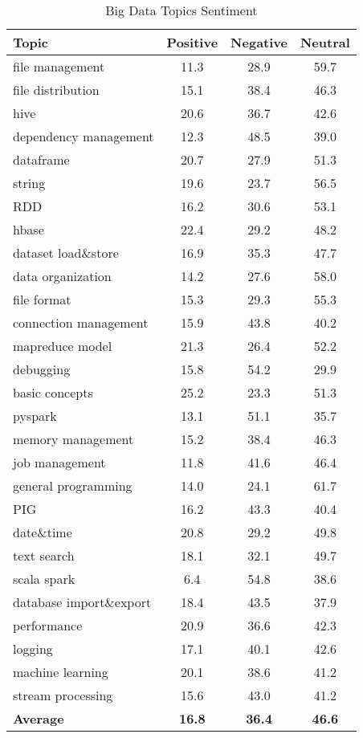 \begin{table}[tbp]
\caption{Big Data Topics Sentiment}
\label{tab:SentiBigdata}
\centering
\begin{tabular}{lccc} \hline
\textbf{Topic} & \textbf{Positive} & \textbf{Negative} & \textbf{Neutral} \\ \hline
file management & 11.3 & 28.9 & 59.7 \\
file distribution & 15.1 & 38.4 & 46.3 \\ 
hive & 20.6 & 36.7 & 42.6 \\
dependency management & 12.3 & 48.5 & 39.0 \\
dataframe & 20.7 & 27.9 & 51.3 \\
string & 19.6 & 23.7 & 56.5 \\
RDD& 16.2 & 30.6 & 53.1 \\
hbase & 22.4 & 29.2 & 48.2 \\
dataset load\&store & 16.9 & 35.3 & 47.7 \\
data organization & 14.2 & 27.6 & 58.0\\
file format & 15.3 & 29.3 & 55.3 \\
connection management & 15.9 & 43.8 & 40.2 \\
mapreduce model & 21.3 & 26.4 & 52.2 \\
debugging & 15.8 & 54.2 & 29.9 \\
basic concepts & 25.2 & 23.3 & 51.3 \\
pyspark & 13.1 & 51.1 & 35.7 \\
memory management & 15.2 & 38.4 & 46.3 \\
job management & 11.8 & 41.6 & 46.4 \\
general programming & 14.0 & 24.1 & 61.7 \\
PIG & 16.2 & 43.3 & 40.4 \\
date\&time & 20.8 & 29.2 & 49.8 \\
text search & 18.1 & 32.1 & 49.7 \\
scala spark & 6.4 & 54.8 & 38.6 \\
database import\&export & 18.4 & 43.5 & 37.9 \\
performance & 20.9 & 36.6 & 42.3 \\
logging & 17.1 & 40.1 & 42.6 \\
machine learning & 20.1 & 38.6 & 41.2 \\
stream processing & 15.6 & 43.0 & 41.2 \\ \hline
\textbf{Average} & \textbf{16.8} & \textbf{36.4} & \textbf{46.6}\\ \hline
\end{tabular}
\end{table}



